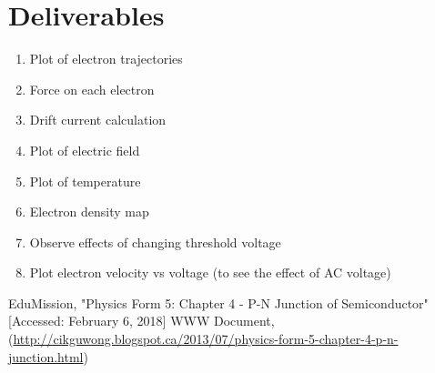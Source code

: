 \documentclass{article}
\begin{document}
\section{Deliverables}
\begin{enumerate}
\item Plot of electron trajectories
\item Force on each electron
\item Drift current calculation
\item Plot of electric field
\item Plot of temperature
\item Electron density map
\item Observe effects of changing threshold voltage
\item Plot electron velocity vs voltage (to see the effect of AC voltage)
\end{enumerate}

\begin{thebibliography}{9}
 EduMission, "Physics Form 5: Chapter 4 - P-N Junction of Semiconductor" [Accessed: February 6, 2018] WWW Document,  (\url{http://cikguwong.blogspot.ca/2013/07/physics-form-5-chapter-4-p-n-junction.html})
\end{thebibliography}
\end{document}
